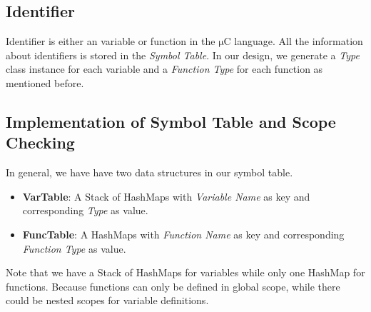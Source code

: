 \documentclass[a4paper,11pt]{article}
\newcommand{\uC}{{$\mathrm{\mu}$}C }
\begin{document}
\subsection{Identifier}
Identifier is either an variable or function in the \uC language. All the information about identifiers is stored in the \emph{Symbol Table}. In our design, we generate a \emph{Type} class instance for each variable and a \emph{Function Type} for each function as mentioned before.


\subsection{Implementation of Symbol Table and Scope Checking}

	In general, we have have two data structures in our symbol table. 
\begin{itemize}
	\item \textbf{VarTable}: A Stack of HashMaps with \emph{Variable Name} as key and corresponding \emph{Type} as value.
	\item \textbf{FuncTable}: A HashMaps with \emph{Function Name} as key and corresponding \emph{Function Type} as value.
\end{itemize}
	
	Note that we have a Stack of HashMaps for variables while only one HashMap for functions. Because functions can only be defined in global scope, while there could be nested scopes for variable definitions. \\
	
\end{document}
